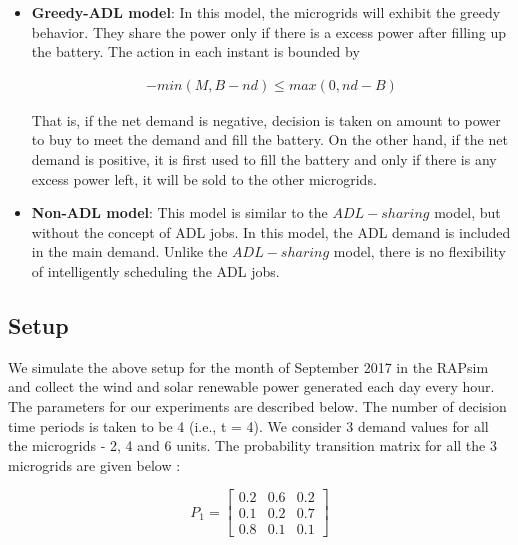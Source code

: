 \begin{itemize}
	\item \textbf{Greedy-ADL model}: In this model, the microgrids will exhibit the greedy behavior. They share the power only if there is a excess power after filling up the battery. The action in each instant is bounded by   
	
	\begin{align}
	-min(M, B - nd) \leq max(0,nd - B) 
	\end{align}
	
	That is, if the net demand is negative, decision is taken on amount to power to buy to meet the demand and fill the battery. On the other hand, if the net demand is positive, it is first used to fill the battery and only if there is any excess power left, it will be sold to the other microgrids.
	
	\item \textbf{Non-ADL model}:  This model is similar to the $ADL-sharing$ model, but without the concept of ADL jobs. In this model, the ADL demand is included in the main demand. Unlike the $ADL-sharing$ model, there is no flexibility of intelligently scheduling the ADL jobs. 
	
\end{itemize}

\subsection{Setup}


We simulate the above setup for the month of September 2017 in the RAPsim and collect the wind and solar renewable power generated each day every hour. The parameters for our experiments are described below. The number of decision time periods is taken to be 4 (i.e., t = 4). We consider 3 demand values for all the microgrids - 2, 4 and 6 units. The probability transition matrix for all the 3 microgrids are given below :


\[
P_{1}=
\begin{bmatrix}
0.2 & 0.6 & 0.2 \\
0.1 & 0.2 & 0.7 \\
0.8 & 0.1 & 0.1
\end{bmatrix}
\]

